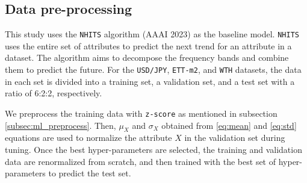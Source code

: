 \subsection{Data pre-processing}
\label{subsec:baseline_prepocess}


This study uses the \verb|NHITS| algorithm (AAAI 2023) as the baseline model. \verb|NHITS| uses the entire set of attributes to predict the next trend for an attribute in a dataset. The algorithm aims to decompose the frequency bands and combine them to predict the future. For the \verb|USD/JPY|, \verb|ETT-m2|, and \verb|WTH| datasets, the data in each set is divided into a training set, a validation set, and a test set with a ratio of 6:2:2, respectively.


We preprocess the training data with \verb|z-score| as mentioned in subsection \ref{subsec:ml_preprocess}. Then, $\mu_{X}$ and $\sigma_{X}$ obtained from \ref{eq:mean} and \ref{eq:std} equations are used to normalize the attribute $X$ in the validation set during tuning. Once the best hyper-parameters are selected, the training and validation data are renormalized from scratch, and then trained with the best set of hyper-parameters to predict the test set.


